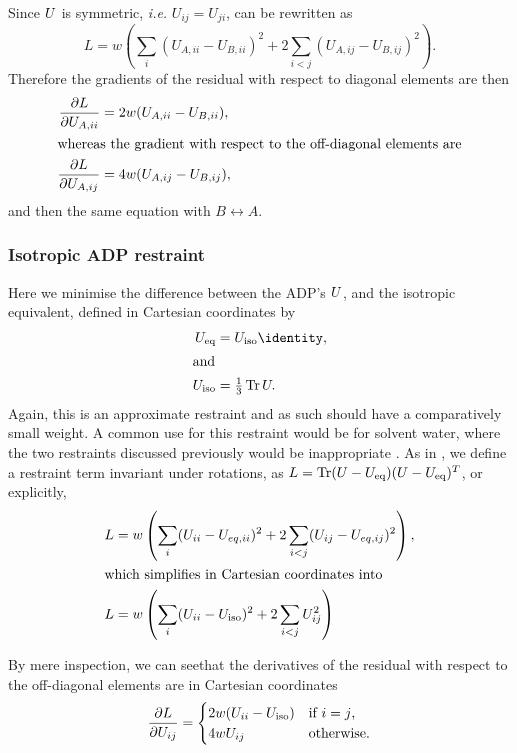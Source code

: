 \documentclass[pdf]{iucr}
\begin{document}
Since $U$ is symmetric, \emph{i.e.} $U_{ij} = U_{ji}$,  can be rewritten as
\begin{equation}
L = w \left( \sum_i (U_{A,ii} - U_{B,ii})^2 + 2 \sum_{i < j} (U_{A,ij} - U_{B,ij})^2 \right) .
\end{equation}
Therefore the gradients of the residual with respect to diagonal elements are then
\begin{align}
\frac{\partial L}{\partial U_{A,ii}} &= 2w(U_{A,ii} - U_{B,ii}),\\
\shortintertext{whereas the gradient with respect to the off-diagonal elements are}
\frac{\partial L}{\partial U_{A,ij}} &=  4w(U_{A,ij} - U_{B,ij}),
\end{align}
and then the same equation with $B \leftrightarrow A$.

\subsubsection{Isotropic ADP restraint}
Here we minimise the difference between the ADP's $U$, and the isotropic equivalent, defined in Cartesian coordinates by
\begin{align}
\mat{U}_\text{eq} &= U_\text{iso}\identity, \\
\shortintertext{and}
U_\text{iso} &= \tfrac{1}{3} \tr \mat{U}.
\end{align}
Again, this is an approximate restraint and as such should have a comparatively small weight. A common use for this restraint would be for solvent water, where the two restraints discussed previously would be inappropriate \cite{Sheldrick:1997aa}. As in , we define a restraint term invariant under rotations, as $L = \operatorname{Tr} (U-U_\text{eq})(U-U_\text{eq})^T$, or explicitly,
\begin{align}
\label{eqn:ADP:restraints:isotropic}
L &= w \left( \sum_i (U_{ii} - U_{eq,ii})^2 + 2 \sum_{i<j} (U_{ij}-U_{eq,ij})^2 \right),\\
\shortintertext{which simplifies in Cartesian coordinates into}
L &= w \left( \sum_i (U_{ii} - U_\text{iso})^2 + 2 \sum_{i<j} U_{ij}^2 \right)
\end{align}

By mere inspection, we can seethat the derivatives of the residual with respect to the off-diagonal elements are in Cartesian coordinates
\begin{equation}
\frac{\partial L}{\partial U_{ij}} = \begin{cases}
 2 w (U_{ii} - U_\text{iso}) & \text{if $i=j$,}\\
 4 w U_{ij} & \text{otherwise}.
 \end{cases}
\end{equation}
\end{document}
